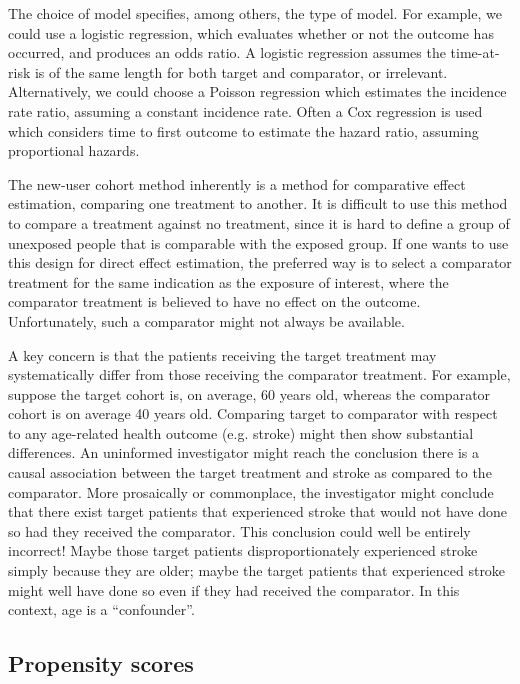 \documentclass[11pt]{book}
\let\BeginKnitrBlock\begin \let\EndKnitrBlock\end
\begin{document}
The choice of model specifies, among others, the type of model. For
example, we could use a logistic regression, which evaluates whether or
not the outcome has occurred, and produces an odds ratio. A logistic
regression assumes the time-at-risk is of the same length for both
target and comparator, or irrelevant. Alternatively, we could choose a
Poisson regression which estimates the incidence rate ratio, assuming a
constant incidence rate. Often a Cox regression is used which considers
time to first outcome to estimate the hazard ratio, assuming
proportional hazards.

\BeginKnitrBlock{rmdimportant}
The new-user cohort method inherently is a method for comparative effect
estimation, comparing one treatment to another. It is difficult to use
this method to compare a treatment against no treatment, since it is
hard to define a group of unexposed people that is comparable with the
exposed group. If one wants to use this design for direct effect
estimation, the preferred way is to select a comparator treatment for
the same indication as the exposure of interest, where the comparator
treatment is believed to have no effect on the outcome. Unfortunately,
such a comparator might not always be available.
\EndKnitrBlock{rmdimportant}

A key concern is that the patients receiving the target treatment may
systematically differ from those receiving the comparator treatment. For
example, suppose the target cohort is, on average, 60 years old, whereas
the comparator cohort is on average 40 years old. Comparing target to
comparator with respect to any age-related health outcome (e.g. stroke)
might then show substantial differences. An uninformed investigator
might reach the conclusion there is a causal association between the
target treatment and stroke as compared to the comparator. More
prosaically or commonplace, the investigator might conclude that there
exist target patients that experienced stroke that would not have done
so had they received the comparator. This conclusion could well be
entirely incorrect! Maybe those target patients disproportionately
experienced stroke simply because they are older; maybe the target
patients that experienced stroke might well have done so even if they
had received the comparator. In this context, age is a ``confounder''.

\subsection{Propensity scores}\label{propensity-scores}
\end{document}
